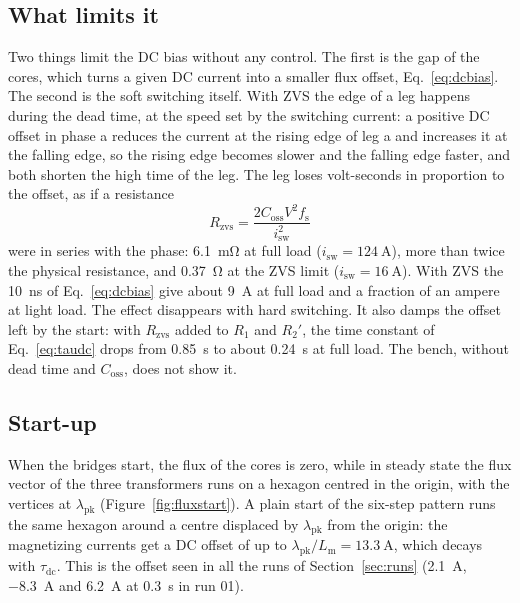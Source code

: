 \documentclass[12pt,a4paper]{scrartcl}
\newcommand{\ped}[1]{_{\mathrm{#1}}}
\begin{document}
\begin{onehalfspace}
\subsection{What limits it}
\label{sec:dc_limit}

Two things limit the DC bias without any control. The first is the gap of the cores, which turns a given DC current into a smaller flux offset, Eq.~\eqref{eq:dcbias}. The second is the soft switching itself. With ZVS the edge of a leg happens during the dead time, at the speed set by the switching current: a positive DC offset in phase a reduces the current at the rising edge of leg a and increases it at the falling edge, so the rising edge becomes slower and the falling edge faster, and both shorten the high time of the leg. The leg loses volt-seconds in proportion to the offset, as if a resistance
\begin{equation}
	R\ped{zvs} = \frac{2 C\ped{oss} V^2 f\ped{s}}{i\ped{sw}^2}
	\label{eq:rzvs}
\end{equation}
were in series with the phase: \SI{6.1}{\milli\ohm} at full load ($i\ped{sw} = \SI{124}{\ampere}$), more than twice the physical resistance, and \SI{0.37}{\ohm} at the ZVS limit ($i\ped{sw} = \SI{16}{\ampere}$). With ZVS the \SI{10}{\nano\second} of Eq.~\eqref{eq:dcbias} give about \SI{9}{\ampere} at full load and a fraction of an ampere at light load. The effect disappears with hard switching. It also damps the offset left by the start: with $R\ped{zvs}$ added to $R\ped{1}$ and $R\ped{2}'$, the time constant of Eq.~\eqref{eq:taudc} drops from \SI{0.85}{\second} to about \SI{0.24}{\second} at full load. The bench, without dead time and $C\ped{oss}$, does not show it.

\subsection{Start-up}
\label{sec:start}

When the bridges start, the flux of the cores is zero, while in steady state the flux vector of the three transformers runs on a hexagon centred in the origin, with the vertices at $\lambda\ped{pk}$ (Figure~\ref{fig:fluxstart}). A plain start of the six-step pattern runs the same hexagon around a centre displaced by $\lambda\ped{pk}$ from the origin: the magnetizing currents get a DC offset of up to $\lambda\ped{pk}/L\ped{m} = \SI{13.3}{\ampere}$, which decays with $\tau\ped{dc}$. This is the offset seen in all the runs of Section~\ref{sec:runs} (\SI{2.1}{\ampere}, \SI{-8.3}{\ampere} and \SI{6.2}{\ampere} at \SI{0.3}{\second} in run 01).


\end{onehalfspace}
\end{document}

